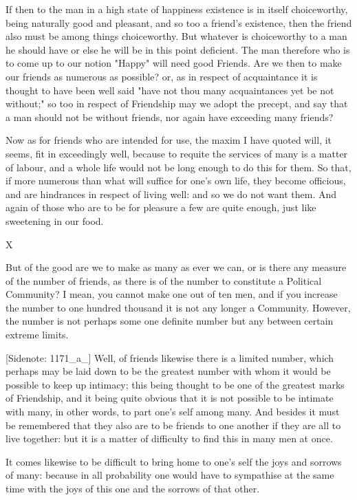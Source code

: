 If then to the man in a high state of happiness existence is in itself
choiceworthy, being naturally good and pleasant, and so too a friend's
existence, then the friend also must be among things choiceworthy. But
whatever is choiceworthy to a man he should have or else he will be in
this point deficient. The man therefore who is to come up to our notion
"Happy" will need good Friends. Are we then to make our friends as
numerous as possible? or, as in respect of acquaintance it is thought
to have been well said "have not thou many acquaintances yet be not
without;" so too in respect of Friendship may we adopt the precept, and
say that a man should not be without friends, nor again have exceeding
many friends?

Now as for friends who are intended for use, the maxim I have quoted
will, it seems, fit in exceedingly well, because to requite the services
of many is a matter of labour, and a whole life would not be long enough
to do this for them. So that, if more numerous than what will suffice
for one's own life, they become officious, and are hindrances in respect
of living well: and so we do not want them. And again of those who are
to be for pleasure a few are quite enough, just like sweetening in our
food.




X


But of the good are we to make as many as ever we can, or is there
any measure of the number of friends, as there is of the number to
constitute a Political Community? I mean, you cannot make one out of ten
men, and if you increase the number to one hundred thousand it is not
any longer a Community. However, the number is not perhaps some one
definite number but any between certain extreme limits.

[Sidenote: 1171_a_] Well, of friends likewise there is a limited number,
which perhaps may be laid down to be the greatest number with whom it
would be possible to keep up intimacy; this being thought to be one of
the greatest marks of Friendship, and it being quite obvious that it is
not possible to be intimate with many, in other words, to part one's
self among many. And besides it must be remembered that they also are to
be friends to one another if they are all to live together: but it is a
matter of difficulty to find this in many men at once.

It comes likewise to be difficult to bring home to one's self the joys
and sorrows of many: because in all probability one would have to
sympathise at the same time with the joys of this one and the sorrows of
that other.

